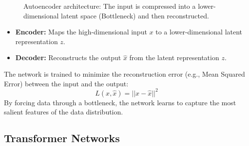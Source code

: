 \begin{figure}[htbp]
    \caption{Autoencoder architecture: The input is compressed into a lower-dimensional latent space (Bottleneck) and then reconstructed.}
    \label{fig:autoencoder}
\end{figure}

\begin{itemize}
    \item \textbf{Encoder:} Maps the high-dimensional input $x$ to a lower-dimensional latent representation $z$.
    \item \textbf{Decoder:} Reconstructs the output $\hat{x}$ from the latent representation $z$.
\end{itemize}

The network is trained to minimize the reconstruction error (e.g., Mean Squared Error) between the input and the output:
\[
L(x, \hat{x}) = || x - \hat{x} ||^2
\]
By forcing data through a bottleneck, the network learns to capture the most salient features of the data distribution.




\subsection{Transformer Networks}

